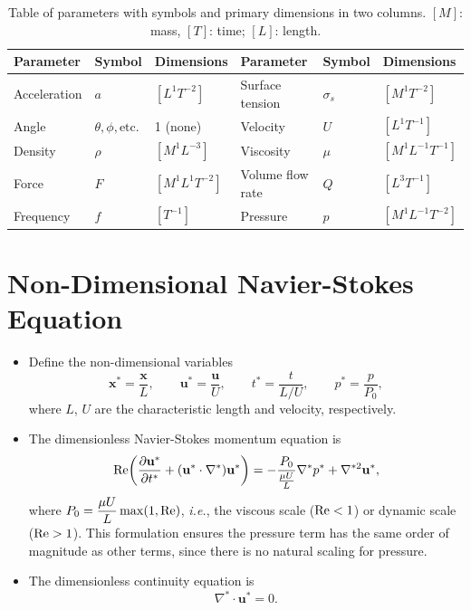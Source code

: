 \documentclass[a4paper]{article}
\begin{document}
\begin{table}[h]
    \centering
    \begin{tabular}{lll|lll}
        \toprule
        \textbf{Parameter} & \textbf{Symbol} & \textbf{Dimensions} & \textbf{Parameter} & \textbf{Symbol} & \textbf{Dimensions} \\
        \midrule
        Acceleration           & \( a \)             & \( [L^1 T^{-2}] \)   & Surface tension        & \( \sigma_s \)      & \( [M^1 T^{-2}] \)   \\
        Angle                  & \( \theta, \phi, \text{etc.} \) & 1 (none)   & Velocity               & \( U \)             & \( [L^1 T^{-1}] \)   \\
        Density                & \( \rho \)         & \( [M^1 L^{-3}] \)   & Viscosity              & \( \mu \)           & \( [M^1 L^{-1} T^{-1}] \)   \\
        Force                  & \( F \)             & \( [M^1 L^1 T^{-2}] \)   & Volume flow rate       & \( Q \)       & \( [L^3 T^{-1}] \)   \\
        Frequency              & \( f \)             & \( [T^{-1}] \)   & Pressure               & \( p \)             & \( [M^1 L^{-1} T^{-2}] \)   \\
        \bottomrule
    \end{tabular}
    \caption{Table of parameters with symbols and primary dimensions in two columns. $[M]$: mass, $[T]$: time; $[L]$: length.}
    \label{tab:dim_less_common_params}
\end{table}


\section{Non-Dimensional Navier-Stokes Equation}
\begin{itemize}
    \item Define the non-dimensional variables
    \[
        \mathbf{x}^* = \frac{\mathbf{x}}{L},
        \quad \quad
        \mathbf{u}^* = \frac{\mathbf{u}}{U},
        \quad \quad
        t^* = \frac{t}{L/U},
        \quad \quad
        p^* = \frac{p}{P_0},
    \]
    where $L$, $U$ are the characteristic length and velocity, respectively.
    
    \item The dimensionless Navier-Stokes momentum equation is
     \[ 
        {\rm Re}\bigg(\frac{\partial \mathbf{u^{*}}}{\partial t^{*}} + (\mathbf{u^{*}}\cdot \nabla^{*})\mathbf{u^{*}} \bigg) = -\frac{P_{0}}{\frac{\mu U}{L}}\nabla^{*} p^{*} + \nabla^{*2}\mathbf{u^{*}},
     \]
    where $\displaystyle P_{0} = \frac{\mu U}{L}\max(1,{\rm Re})$, \textit{i.e.}, the viscous scale ($\rm Re < 1$) or dynamic scale  ($\rm Re > 1$). This formulation ensures the pressure term has the same order of magnitude as other terms, since there is no natural scaling for pressure.

    \item The dimensionless continuity equation is
     \[ \nabla^{*} \cdot \mathbf{u}^{*} = 0.\]
\end{itemize}
\end{document}
